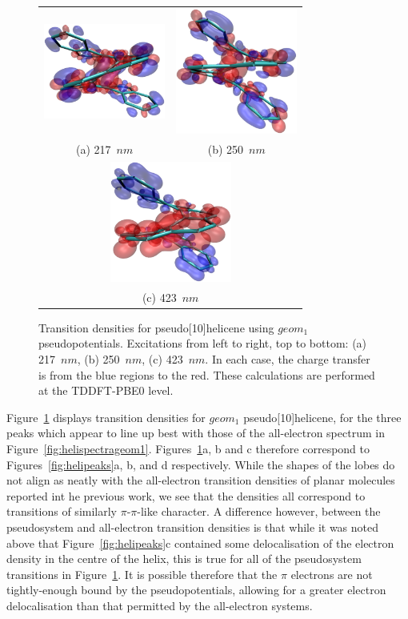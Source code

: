 \documentclass[aip,reprint,nofootinbib]{revtex4-1}
\begin{document}
\begin{figure}
\begin{tabular}{cc}
\includegraphics[width=4cm]{psh10-pk1} &
\includegraphics[width=4cm]{psh10-pk2} \\
(a) 217~$nm$ & (b) 250~$nm$ \\
\multicolumn{2}{c}{\includegraphics[width=4cm]{psh10-pk3}} \\
\multicolumn{2}{c}{(c) 423~$nm$}\\
\end{tabular}
\caption[$geom_1$ pseudo{[10]}helicene transition densities.]{Transition densities for pseudo[10]helicene using $geom_1$ pseudopotentials. Excitations from left to right, top to bottom: (a) 217~$nm$, (b) 250~$nm$, (c) 423~$nm$. In each case, the charge transfer is from the blue regions to the red. These calculations are performed at the TDDFT-PBE0 level.}\label{fig:pshelipeaks}
\end{figure}

Figure~\ref{fig:pshelipeaks} displays transition densities for $geom_1$ pseudo[10]helicene, for the three peaks which appear to line up best with those of the all-electron spectrum in Figure~\ref{fig:helispectrageom1}. Figures~\ref{fig:pshelipeaks}a, b and c therefore correspond to Figures~\ref{fig:helipeaks}a, b, and d respectively. While the shapes of the lobes do not align as neatly with the all-electron transition densities of planar molecules reported int he previous work, we see that the densities all correspond to transitions of similarly $\pi$-$\pi$-like character. A difference however, between the pseudosystem and all-electron transition densities is that while it was noted above that Figure~\ref{fig:helipeaks}c contained some delocalisation of the electron density in the centre of the helix, this is true for all of the pseudosystem transitions in Figure~\ref{fig:pshelipeaks}. It is possible therefore that the $\pi$ electrons are not tightly-enough bound by the pseudopotentials, allowing for a greater electron delocalisation than that permitted by the all-electron systems.
\end{document}
